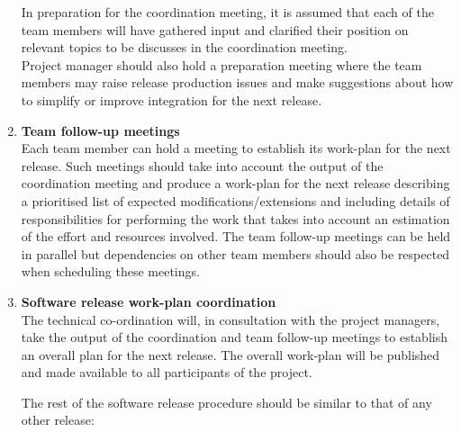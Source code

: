 \begin{enumerate}
\noindent In preparation for the coordination meeting, it is assumed that each of the team members will have gathered input and clarified their position on relevant topics to be discusses in the coordination meeting.\\

\noindent Project manager should also hold a preparation meeting where the team members may raise release production issues and make suggestions about how to simplify or improve integration for the next release.

\item \textbf{Team follow-up meetings}\\
\noindent Each team member can hold a meeting to establish its work-plan for the next release. Such meetings should take into account the output of the coordination meeting and produce a work-plan for the next release describing a prioritised list of expected modifications/extensions and including details of responsibilities for performing the work that takes into account an estimation of the effort and resources involved. The team follow-up meetings can be held in parallel but dependencies on other team members should also be respected when scheduling these meetings.

\item \textbf{Software release work-plan coordination}\\
\noindent The technical co-ordination will, in consultation with the project managers, take the output of the coordination and team follow-up meetings to establish an overall plan for the next release. The overall work-plan will be published and made available to all participants of the project.

\hspace*{-0,5cm}The rest of the software release procedure should be similar to that of any other release:


\end{enumerate}
